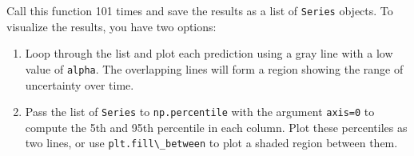 Call this function 101 times and save the results as a list of
\passthrough{\lstinline!Series!} objects. To visualize the results, you
have two options:

\begin{enumerate}
\def\labelenumi{\arabic{enumi}.}
\item
  Loop through the list and plot each prediction using a gray line with
  a low value of \passthrough{\lstinline!alpha!}. The overlapping lines
  will form a region showing the range of uncertainty over time.
\item
  Pass the list of \passthrough{\lstinline!Series!} to
  \passthrough{\lstinline!np.percentile!} with the argument
  \passthrough{\lstinline!axis=0!} to compute the 5th and 95th
  percentile in each column. Plot these percentiles as two lines, or use
  \passthrough{\lstinline!plt.fill\_between!} to plot a shaded region
  between them.
\end{enumerate}

